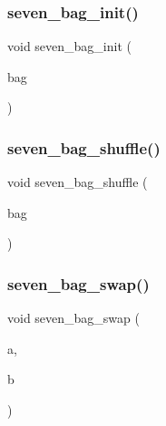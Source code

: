 \subsubsection{seven\+\_\+bag\+\_\+init()}
{\footnotesize\ttfamily void seven\+\_\+bag\+\_\+init (\begin{DoxyParamCaption}\item[{\textbf{ Piece\+Type} $\ast$}]{bag }\end{DoxyParamCaption})}

\mbox{\label{seven__bag_8h_a0db30dac70a7e9953f3709d2d12eeb0f}} 
\subsubsection{seven\+\_\+bag\+\_\+shuffle()}
{\footnotesize\ttfamily void seven\+\_\+bag\+\_\+shuffle (\begin{DoxyParamCaption}\item[{\textbf{ Piece\+Type} $\ast$}]{bag }\end{DoxyParamCaption})}

\mbox{\label{seven__bag_8h_a2c3087bc0bfcc740eb24edb2e36f2763}} 
\subsubsection{seven\+\_\+bag\+\_\+swap()}
{\footnotesize\ttfamily void seven\+\_\+bag\+\_\+swap (\begin{DoxyParamCaption}\item[{\textbf{ Piece\+Type} $\ast$}]{a,  }\item[{\textbf{ Piece\+Type} $\ast$}]{b }\end{DoxyParamCaption})}

